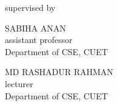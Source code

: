\documentclass[a4paper,12pt]{report}
\begin{document}
\begin{titlepage}
	\vspace{0.5cm}
	supervised by

	\parbox[l]{8cm}{\begin{center}

			SABIHA ANAN\\
			\footnotesize{assistant professor\\
				Department of CSE, CUET}
		\end{center}
	}
	\parbox[r]{8cm}{\begin{center}

			MD RASHADUR RAHMAN\\
			\footnotesize{lecturer \\
				Department of CSE, CUET}
		\end{center}
	}

	\vfill
\end{titlepage}


\onehalfspacing

\end{document}
